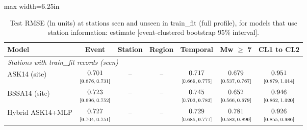 \begin{table}[htbp]
\centering
\caption{Test RMSE (ln units) at stations seen and unseen in train\_fit (full profile), for models that use station information: estimate [event-clustered bootstrap 95\% interval].}
\label{tab:tableS4_station_rmse}
\small
\begin{adjustbox}{max width=6.25in}
\begin{tabular}{lcccccc}
\toprule
Model & Event & Station & Region & Temporal & Mw $\geq$ 7 & CL1 to CL2 \\
\midrule
\multicolumn{7}{l}{\textit{Stations with train\_fit records (seen)}} \\
ASK14 (site) & $\begin{array}{@{}c@{}}0.701\\[-1pt] \scriptstyle[0.676,\,0.731]\end{array}$ & -- & -- & $\begin{array}{@{}c@{}}0.717\\[-1pt] \scriptstyle[0.669,\,0.775]\end{array}$ & $\begin{array}{@{}c@{}}0.679\\[-1pt] \scriptstyle[0.537,\,0.767]\end{array}$ & $\begin{array}{@{}c@{}}0.951\\[-1pt] \scriptstyle[0.879,\,1.014]\end{array}$ \\
BSSA14 (site) & $\begin{array}{@{}c@{}}0.723\\[-1pt] \scriptstyle[0.696,\,0.752]\end{array}$ & -- & -- & $\begin{array}{@{}c@{}}0.745\\[-1pt] \scriptstyle[0.703,\,0.782]\end{array}$ & $\begin{array}{@{}c@{}}0.652\\[-1pt] \scriptstyle[0.566,\,0.679]\end{array}$ & $\begin{array}{@{}c@{}}0.946\\[-1pt] \scriptstyle[0.862,\,1.020]\end{array}$ \\
Hybrid ASK14+MLP & $\begin{array}{@{}c@{}}0.727\\[-1pt] \scriptstyle[0.704,\,0.751]\end{array}$ & -- & -- & $\begin{array}{@{}c@{}}0.729\\[-1pt] \scriptstyle[0.685,\,0.771]\end{array}$ & $\begin{array}{@{}c@{}}0.781\\[-1pt] \scriptstyle[0.583,\,0.890]\end{array}$ & $\begin{array}{@{}c@{}}0.926\\[-1pt] \scriptstyle[0.855,\,0.986]\end{array}$ \\

\end{tabular}
\end{adjustbox}
\end{table}
